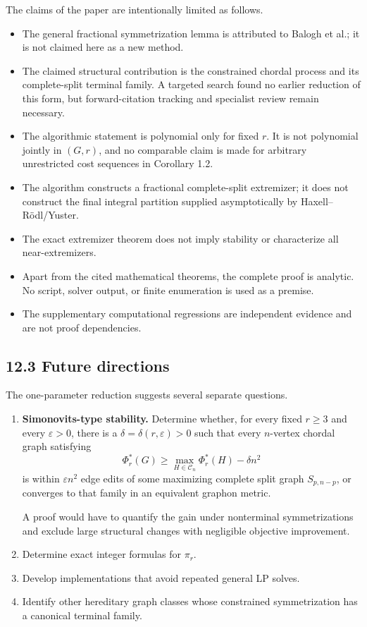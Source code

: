 \documentclass[11pt,a4paper]{article}
\providecommand{\tightlist}{\setlength{\itemsep}{0pt}\setlength{\parskip}{0pt}}
\begin{document}
The claims of the paper are intentionally limited as follows.

\begin{itemize}
\tightlist
\item
  The general fractional symmetrization lemma is attributed to Balogh et al.;
  it is not claimed here as a new method.
\item
  The claimed structural contribution is the constrained chordal process
  and its complete-split terminal family. A targeted search found no earlier
  reduction of this form, but forward-citation tracking and specialist
  review remain necessary.
\item
  The algorithmic statement is polynomial only for fixed \(r\). It is not
  polynomial jointly in \((G,r)\), and no comparable claim is made for
  arbitrary unrestricted cost sequences in Corollary 1.2.
\item
  The algorithm constructs a fractional complete-split extremizer; it does
  not construct the final integral partition supplied asymptotically by
  Haxell--Rödl/Yuster.
\item
  The exact extremizer theorem does not imply stability or characterize all
  near-extremizers.
\item
  Apart from the cited mathematical theorems, the complete proof is
  analytic. No script, solver output, or finite enumeration is used as a
  premise.
\item
  The supplementary computational regressions are independent evidence
  and are not proof dependencies.
\end{itemize}

\subsection{12.3 Future directions}\label{future-directions}

The one-parameter reduction suggests several separate questions.

\begin{enumerate}
\def\labelenumi{\arabic{enumi}.}
\item
  \textbf{Simonovits-type stability.} Determine whether, for every fixed
  \(r\ge3\) and every \(\varepsilon>0\), there is a
  \(\delta=\delta(r,\varepsilon)>0\) such that every \(n\)-vertex chordal
  graph satisfying
  \[
  \Phi_r^*(G)
  \ge
  \max_{H\in\mathcal C_n}\Phi_r^*(H)-\delta n^2
  \]
  is within \(\varepsilon n^2\) edge edits of some maximizing complete
  split graph \(S_{p,n-p}\), or converges to that family in an equivalent
  graphon metric.

  A proof would have to quantify the gain under nonterminal
  symmetrizations and exclude large structural changes with negligible
  objective improvement.
\item
  Determine exact integer formulas for \(\pi_r\).
\item
  Develop implementations that avoid repeated general LP solves.
\item
  Identify other hereditary graph classes whose constrained
  symmetrization has a canonical terminal family.
\end{enumerate}
\end{document}
